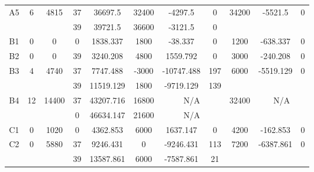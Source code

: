\begin{sidewaystable}
\begin{tabular}{c||c|c||c|c|c|c|c||c|c|c}
        
      \\
      \hline
      \multirow{2}{*}{A5} &
      \multirow{2}{*}{6} &
      \multirow{2}{*}{4815} &
      37 &
      36697.5 &
      32400 &
        -4297.5 &
        0 &
      \multirow{2}{*}{34200} &
        \multirow{2}{*}{-5521.5} &
        \multirow{2}{*}{0}
      \\
      \cline{4-8}
       &
       &
       &
      39 &
      39721.5 &
      36600 &
        -3121.5 &
        0 &
      
         &
        
      \\
      \hline
      \multirow{1}{*}{B1} &
      \multirow{1}{*}{0} &
      \multirow{1}{*}{0} &
      0 &
      1838.337 &
      1800 &
        -38.337 &
        0 &
      \multirow{1}{*}{1200} &
        \multirow{1}{*}{-638.337} &
        \multirow{1}{*}{0}
      \\
      \hline
      \multirow{1}{*}{B2} &
      \multirow{1}{*}{0} &
      \multirow{1}{*}{0} &
      39 &
      3240.208 &
      4800 &
        1559.792 &
        0 &
      \multirow{1}{*}{3000} &
        \multirow{1}{*}{-240.208} &
        \multirow{1}{*}{0}
      \\
      \hline
      \multirow{2}{*}{B3} &
      \multirow{2}{*}{4} &
      \multirow{2}{*}{4740} &
      37 &
      7747.488 &
      -3000 &
        -10747.488 &
        197 &
      \multirow{2}{*}{6000} &
        \multirow{2}{*}{-5519.129} &
        \multirow{2}{*}{0}
      \\
      \cline{4-8}
       &
       &
       &
      39 &
      11519.129 &
      1800 &
        -9719.129 &
        139 &
      
         &
        
      \\
      \hline
      \multirow{2}{*}{B4} &
      \multirow{2}{*}{12} &
      \multirow{2}{*}{14400} &
      37 &
      43207.716 &
      16800 &
        \multicolumn{2}{|c||}{N/A} &
      \multirow{2}{*}{32400} &
        \multicolumn{2}{c}{\multirow{2}{*}{N/A}}
      \\
      \cline{4-8}
       &
       &
       &
      0 &
      46634.147 &
      21600 &
        \multicolumn{2}{|c||}{N/A} &
      
        
      \\
      \hline
      \multirow{1}{*}{C1} &
      \multirow{1}{*}{0} &
      \multirow{1}{*}{1020} &
      0 &
      4362.853 &
      6000 &
        1637.147 &
        0 &
      \multirow{1}{*}{4200} &
        \multirow{1}{*}{-162.853} &
        \multirow{1}{*}{0}
      \\
      \hline
      \multirow{2}{*}{C2} &
      \multirow{2}{*}{0} &
      \multirow{2}{*}{5880} &
      37 &
      9246.431 &
      0 &
        -9246.431 &
        113 &
      \multirow{2}{*}{7200} &
        \multirow{2}{*}{-6387.861} &
        \multirow{2}{*}{0}
      \\
      \cline{4-8}
       &
       &
       &
      39 &
      13587.861 &
      6000 &
        -7587.861 &
        21 &
      

\end{tabular}
\end{sidewaystable}
